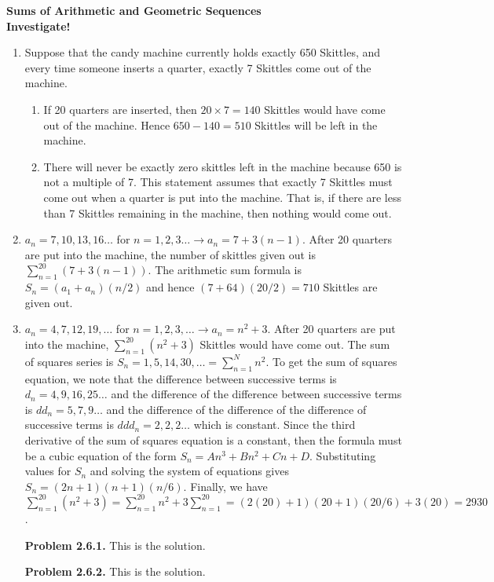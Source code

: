 \documentclass{article}
\begin{document}
	\noindent\textbf{Sums of Arithmetic and Geometric Sequences}\\
	
	\noindent\textbf{Investigate!}
	
	\begin{enumerate}
		\item Suppose that the candy machine currently holds exactly 650 Skittles, and every time someone inserts a quarter, exactly 7 Skittles come out of the machine.
		\begin{enumerate}
			\item If 20 quarters are inserted, then $20\times7 = 140$ Skittles would have come out of the machine. Hence $650 - 140 = 510$ Skittles will be left in the machine.
			\item There will never be exactly zero skittles left in the machine because 650 is not a multiple of 7. This statement assumes that exactly 7 Skittles must come out when a quarter is put into the machine. That is, if there are less than 7 Skittles remaining in the machine, then nothing would come out.
		\end{enumerate}
		\item $a_n = 7, 10, 13, 16\ldots$ for $n = 1, 2, 3\ldots \rightarrow a_n = 7 + 3(n-1)$. After 20 quarters are put into the machine, the number of skittles given out is $\sum_{n=1}^{20} (7 + 3(n-1))$. The arithmetic sum formula is $S_n = (a_1 + a_n)(n/2)$ and hence $(7 + 64)(20/2) = 710$ Skittles are given out.
		\item $a_n = 4, 7, 12, 19,\ldots$ for $n = 1, 2, 3,\ldots \rightarrow a_n = n^2 + 3$. After 20 quarters are put into the machine, $\sum_{n=1}^{20} (n^2 + 3)$ Skittles would have come out. The sum of squares series is $S_n = 1, 5, 14, 30,\ldots = \sum_{n=1}^{N} n^2$. To get the sum of squares equation, we note that the difference between successive terms is $d_n = 4, 9, 16, 25\ldots$ and the difference of the difference between successive terms is $dd_n = 5, 7, 9 \ldots$ and the difference of the difference of the difference of successive terms is $ddd_n = 2, 2, 2 \ldots$ which is constant. Since the third derivative of the sum of squares equation is a constant, then the formula must be a cubic equation of the form $S_n = An^3 + Bn^2 + Cn + D$. Substituting values for $S_n$ and solving the system of equations gives $S_n = (2n+1)(n+1)(n/6)$. Finally, we have $\sum_{n=1}^{20} (n^2 + 3) = \sum_{n=1}^{20} n^2 + 3\sum_{n=1}^{20} = (2(20) +1)(20+1)(20/6) + 3(20) = 2930$.
		
	\end{enumerate}
	
	\begin{itemize}
		\item [\textbf{Problem 2.6.1.}] This is the solution.
		
		\item [\textbf{Problem 2.6.2.}] This is the solution.
		
	\end{itemize}
	
\end{document}
